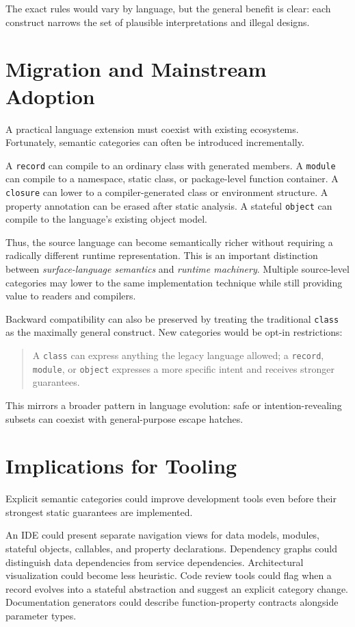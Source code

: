 \documentclass[11pt]{article}
\begin{document}
The exact rules would vary by language, but the general benefit is clear: each construct narrows the set of plausible interpretations and illegal designs.

\section{Migration and Mainstream Adoption}

A practical language extension must coexist with existing ecosystems. Fortunately, semantic categories can often be introduced incrementally.

A \texttt{record} can compile to an ordinary class with generated members. A \texttt{module} can compile to a namespace, static class, or package-level function container. A \texttt{closure} can lower to a compiler-generated class or environment structure. A property annotation can be erased after static analysis. A stateful \texttt{object} can compile to the language's existing object model.

Thus, the source language can become semantically richer without requiring a radically different runtime representation. This is an important distinction between \emph{surface-language semantics} and \emph{runtime machinery}. Multiple source-level categories may lower to the same implementation technique while still providing value to readers and compilers.

Backward compatibility can also be preserved by treating the traditional \texttt{class} as the maximally general construct. New categories would be opt-in restrictions:

\begin{quote}
A \texttt{class} can express anything the legacy language allowed; a \texttt{record}, \texttt{module}, or \texttt{object} expresses a more specific intent and receives stronger guarantees.
\end{quote}

This mirrors a broader pattern in language evolution: safe or intention-revealing subsets can coexist with general-purpose escape hatches.

\section{Implications for Tooling}

Explicit semantic categories could improve development tools even before their strongest static guarantees are implemented.

An IDE could present separate navigation views for data models, modules, stateful objects, callables, and property declarations. Dependency graphs could distinguish data dependencies from service dependencies. Architectural visualization could become less heuristic. Code review tools could flag when a record evolves into a stateful abstraction and suggest an explicit category change. Documentation generators could describe function-property contracts alongside parameter types.
\end{document}
